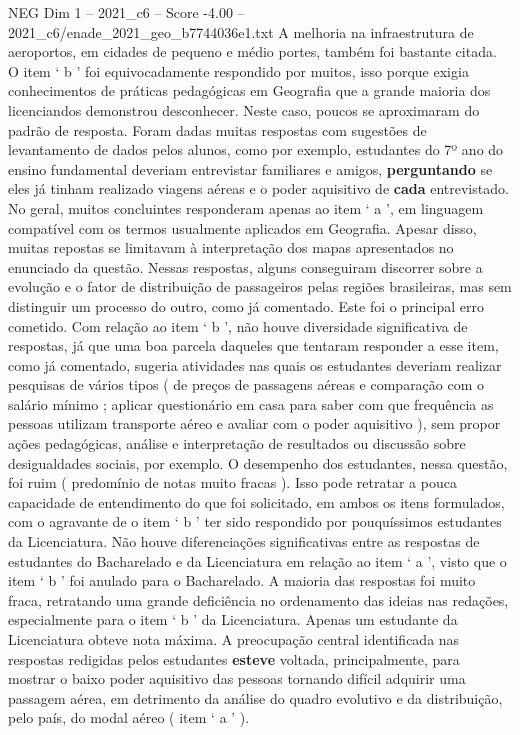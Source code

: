 \begin{textsample}{NEG Dim 1 – 2021\_c6 – Score -4.00 – 2021\_c6/enade\_2021\_geo\_b7744036e1.txt}
A melhoria na infraestrutura de aeroportos, em cidades de pequeno e médio portes, também foi bastante citada.
O item ‘ b ’ foi equivocadamente respondido por muitos, isso porque exigia conhecimentos de práticas pedagógicas em Geografia que a grande maioria dos licenciandos demonstrou desconhecer.
Neste caso, poucos se aproximaram do padrão de resposta.
Foram dadas muitas respostas com sugestões de levantamento de dados pelos alunos, como por exemplo, estudantes do 7º ano do ensino fundamental deveriam entrevistar familiares e amigos, \textbf{perguntando} se eles já tinham realizado viagens aéreas e o poder aquisitivo de \textbf{cada} entrevistado.
No geral, muitos concluintes responderam apenas ao item ‘ a ’, em linguagem compatível com os termos usualmente aplicados em Geografia.
Apesar disso, muitas repostas se limitavam à interpretação dos mapas apresentados no enunciado da questão.
Nessas respostas, alguns conseguiram discorrer sobre a evolução e o fator de distribuição de passageiros pelas regiões brasileiras, mas sem distinguir um processo do outro, como já comentado.
Este foi o principal erro cometido.
Com relação ao item ‘ b ’, não houve diversidade significativa de respostas, já que uma boa parcela daqueles que tentaram responder a esse item, como já comentado, sugeria atividades nas quais os estudantes deveriam realizar pesquisas de vários tipos ( de preços de passagens aéreas e comparação com o salário mínimo ; aplicar questionário em casa para saber com que frequência as pessoas utilizam transporte aéreo e avaliar com o poder aquisitivo ), sem propor ações pedagógicas, análise e interpretação de resultados ou discussão sobre desigualdades sociais, por exemplo.
O desempenho dos estudantes, nessa questão, foi ruim ( predomínio de notas muito fracas ).
Isso pode retratar a pouca capacidade de entendimento do que foi solicitado, em ambos os itens formulados, com o agravante de o item ‘ b ’ ter sido respondido por pouquíssimos estudantes da Licenciatura.
Não houve diferenciações significativas entre as respostas de estudantes do Bacharelado e da Licenciatura em relação ao item ‘ a ’, visto que o item ‘ b ’ foi anulado para o Bacharelado.
A maioria das respostas foi muito fraca, retratando uma grande deficiência no ordenamento das ideias nas redações, especialmente para o item ‘ b ’ da Licenciatura.
Apenas um estudante da Licenciatura obteve nota máxima.
A preocupação central identificada nas respostas redigidas pelos estudantes \textbf{esteve} voltada, principalmente, para mostrar o baixo poder aquisitivo das pessoas tornando difícil adquirir uma passagem aérea, em detrimento da análise do quadro evolutivo e da distribuição, pelo país, do modal aéreo ( item ‘ a ’ ).

\end{textsample}
